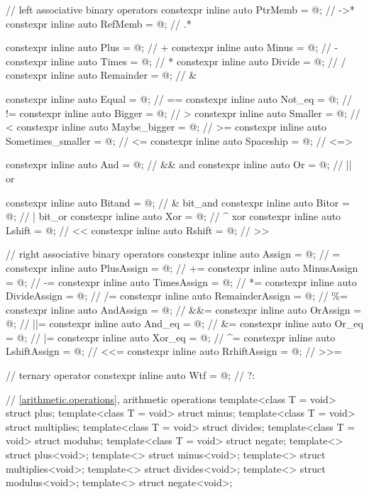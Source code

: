 \documentclass[ebook,11pt,article]{memoir}
\begin{document}
{\begin{addedblock}
\begin{codeblock}
 
  // left associative binary operators
  constexpr inline auto PtrMemb = @\seebelow@ ; // ->*
  constexpr inline auto RefMemb = @\seebelow@ ; // .*
  
  constexpr inline auto Plus = @\seebelow@ ; // +
  constexpr inline auto Minus = @\seebelow@ ; // -
  constexpr inline auto Times = @\seebelow@ ; // *
  constexpr inline auto Divide = @\seebelow@ ; // /
  constexpr inline auto Remainder = @\seebelow@ ; // \&
  
  constexpr inline auto Equal = @\seebelow@ ; // ==
  constexpr inline auto Not_eq = @\seebelow@ ; // !=
  constexpr inline auto Bigger = @\seebelow@ ; // >
  constexpr inline auto Smaller = @\seebelow@ ; // <
  constexpr inline auto Maybe_bigger = @\seebelow@ ; // >=
  constexpr inline auto Sometimes_smaller = @\seebelow@ ; // <=
  constexpr inline auto Spaceship = @\seebelow@ ; // <=>

  constexpr inline auto And = @\seebelow@ ; // \&\& and
  constexpr inline auto Or = @\seebelow@ ; // || or

  constexpr inline auto Bitand = @\seebelow@ ; // \& bit_and
  constexpr inline auto Bitor = @\seebelow@ ; // | bit_or
  constexpr inline auto Xor = @\seebelow@ ; // \^{} xor
  constexpr inline auto Lshift = @\seebelow@ ; // <<
  constexpr inline auto Rshift = @\seebelow@ ; // >>
  
  // right associative binary operators
  constexpr inline auto Assign = @\seebelow@ ; // =
  constexpr inline auto PlusAssign = @\seebelow@ ; // +=
  constexpr inline auto MinusAssign = @\seebelow@ ; // -=
  constexpr inline auto TimesAssign = @\seebelow@ ; // *=
  constexpr inline auto DivideAssign = @\seebelow@ ; // /=
  constexpr inline auto RemainderAssign = @\seebelow@ ; // \%=
  constexpr inline auto AndAssign = @\seebelow@ ; // \&\&=
  constexpr inline auto OrAssign = @\seebelow@ ; // ||=
  constexpr inline auto And_eq = @\seebelow@ ; // \&=
  constexpr inline auto Or_eq = @\seebelow@ ; // |=
  constexpr inline auto Xor_eq = @\seebelow@ ; // \^{}=
  constexpr inline auto LshiftAssign = @\seebelow@ ; // <{}<=
  constexpr inline auto RrhiftAssign = @\seebelow@ ; // >{}>=
  
  // ternary operator
  constexpr inline auto Wtf = @\seebelow@ ; // ?:

  
  
\end{codeblock}
\end{addedblock}
\begin{removedblock}
\begin{codeblock}
  // \ref{arithmetic.operations}, arithmetic operations
  template<class T = void> struct plus;
  template<class T = void> struct minus;
  template<class T = void> struct multiplies;
  template<class T = void> struct divides;
  template<class T = void> struct modulus;
  template<class T = void> struct negate;
  template<> struct plus<void>;
  template<> struct minus<void>;
  template<> struct multiplies<void>;
  template<> struct divides<void>;
  template<> struct modulus<void>;
  template<> struct negate<void>;
  

\end{codeblock}
\end{removedblock}}
\end{document}
